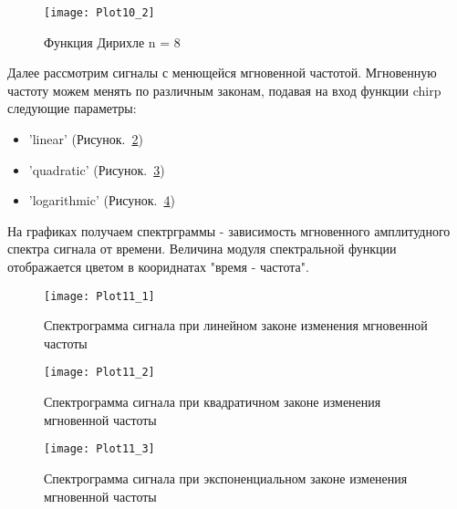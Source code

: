 \begin{figure}[H]
	\begin{center}
		\texttt{[image: Plot10\_2]}
		\caption{Функция Дирихле n = 8} 
		\label{pic:Plot10_2} %
	\end{center}
\end{figure}

Далее рассмотрим сигналы с менющейся мгновенной частотой. Мгновенную частоту можем менять по различным законам, подавая на вход функции chirp следующие параметры:
\begin{itemize}
\item 'linear'  (Рисунок.~\ref{pic:Plot11_1})
\item 'quadratic' (Рисунок.~\ref{pic:Plot11_2})
\item 'logarithmic' (Рисунок.~\ref{pic:Plot11_3})
\end{itemize}


\parindent=1cm %
 На графиках получаем спектрграммы - зависимость мгновенного амплитудного спектра сигнала от времени. Величина модуля спектральной функции отображается цветом в коориднатах "время - частота".

\begin{figure}[H]
	\begin{center}
		\texttt{[image: Plot11\_1]}
		\caption{Спектрограмма сигнала при линейном законе изменения мгновенной частоты} 
		\label{pic:Plot11_1} %
	\end{center}
\end{figure}

\begin{figure}[H]
	\begin{center}
		\texttt{[image: Plot11\_2]}
		\caption{Спектрограмма сигнала при квадратичном законе изменения мгновенной частоты} 
		\label{pic:Plot11_2} %
	\end{center}
\end{figure}

\begin{figure}[H]
	\begin{center}
		\texttt{[image: Plot11\_3]}
		\caption{Спектрограмма сигнала при экспоненциальном законе изменения мгновенной частоты} 
		\label{pic:Plot11_3} %
	\end{center}
\end{figure}


